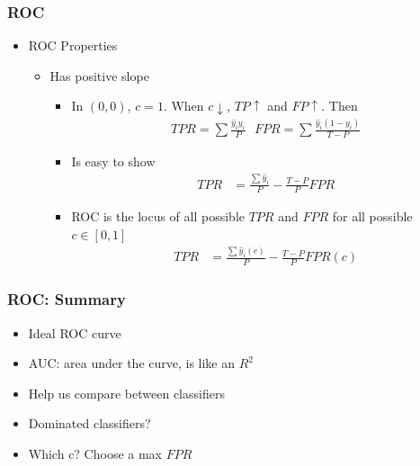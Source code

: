 \documentclass[
  shownotes,
  xcolor={svgnames},
  hyperref={colorlinks,citecolor=DarkBlue,linkcolor=DarkRed,urlcolor=DarkBlue}
  , aspectratio=169]{beamer}
\begin{document}
\begin{frame}[fragile]
\frametitle{ROC}
\begin{itemize}
  \item ROC Properties 

  \begin{itemize}
  \item Has positive slope
  \begin{itemize}
    \item In $(0,0)$, $c=1$. When $c\downarrow$, $TP \uparrow$ and $FP\uparrow$. Then
    \begin{align}
    TPR = \sum \frac{\hat{y}_iy_i}{P} \,\,\,\, FPR = \sum \frac{\hat{y}_i(1-y_i)}{T-P}
    \end{align}
    \item Is easy to show
    \begin{align}
    TPR &= \frac{\sum \hat{y}_i}{P} - \frac{T-P}{P}FPR
    \end{align}
    \item ROC is the locus of all possible $TPR$ and $FPR$ for all possible $c\in[0,1]$ 
    \begin{align}
    TPR &= \frac{\sum \hat{y}_i(c)}{P} - \frac{T-P}{P}FPR(c)
    \end{align}
  \end{itemize}
\end{itemize}  
\end{itemize}




\end{frame}
\begin{frame}[fragile]
\frametitle{ROC: Summary}

\begin{itemize}
  \item Ideal ROC curve
  \medskip
  \item AUC: area under the curve, is like an $R^2$
  \medskip
  \item Help us compare between classifiers
  \medskip
  \item Dominated classifiers?
  \medskip
  \item Which c? Choose a max $FPR$

\end{itemize}

\end{frame}


\end{document}
